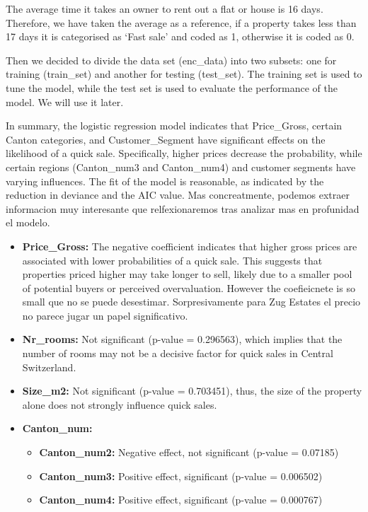\documentclass[
]{article}
\begin{document}
The average time it takes an owner to rent out a flat or house is 16
days. Therefore, we have taken the average as a reference, if a property
takes less than 17 days it is categorised as `Fast sale' and coded as 1,
otherwise it is coded as 0.

Then we decided to divide the data set (enc\_data) into two subsets: one
for training (train\_set) and another for testing (test\_set). The
training set is used to tune the model, while the test set is used to
evaluate the performance of the model. We will use it later.

In summary, the logistic regression model indicates that Price\_Gross,
certain Canton categories, and Customer\_Segment have significant
effects on the likelihood of a quick sale. Specifically, higher prices
decrease the probability, while certain regions (Canton\_num3 and
Canton\_num4) and customer segments have varying influences. The fit of
the model is reasonable, as indicated by the reduction in deviance and
the AIC value. Mas concreatmente, podemos extraer informacion muy
interesante que relfexionaremos tras analizar mas en profunidad el
modelo.

\begin{itemize}
\item
  \textbf{Price\_Gross:} The negative coefficient indicates that higher
  gross prices are associated with lower probabilities of a quick sale.
  This suggests that properties priced higher may take longer to sell,
  likely due to a smaller pool of potential buyers or perceived
  overvaluation. However the coefieicnete is so small que no se puede
  desestimar. Sorpresivamente para Zug Estates el precio no parece jugar
  un papel significativo.
\item
  \textbf{Nr\_rooms:} Not significant (p-value = 0.296563), which
  implies that the number of rooms may not be a decisive factor for
  quick sales in Central Switzerland.
\item
  \textbf{Size\_m2:} Not significant (p-value = 0.703451), thus, the
  size of the property alone does not strongly influence quick sales.
\item
  \textbf{Canton\_num:}

  \begin{itemize}
  \item
    \textbf{Canton\_num2:} Negative effect, not significant (p-value =
    0.07185)
  \item
    \textbf{Canton\_num3:} Positive effect, significant (p-value =
    0.006502)
  \item
    \textbf{Canton\_num4:} Positive effect, significant (p-value =
    0.000767)
  \end{itemize}
\end{itemize}
\end{document}
